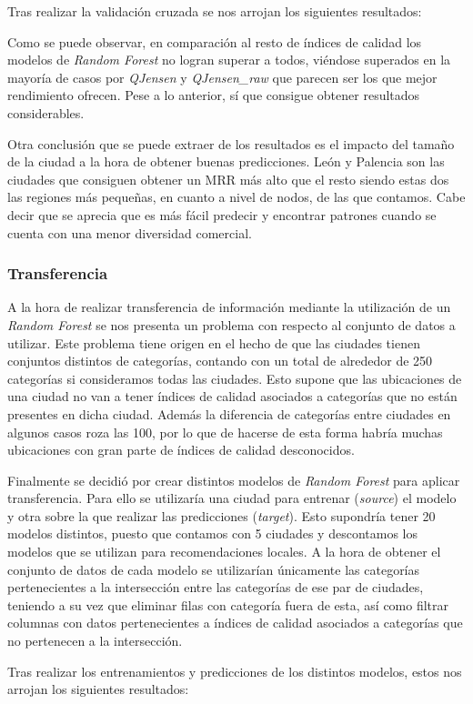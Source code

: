 Tras realizar la validación cruzada se nos arrojan los siguientes resultados:



Como se puede observar, en comparación al resto de índices de calidad los modelos de \textit{Random Forest} no logran superar a todos, viéndose superados en la mayoría de casos por \textit{QJensen} y \textit{QJensen\_raw} que parecen ser los que mejor rendimiento ofrecen. Pese a lo anterior, sí que consigue obtener resultados considerables.

Otra conclusión que se puede extraer de los resultados es el impacto del tamaño de la ciudad a la hora de obtener buenas predicciones. León y Palencia son las ciudades que consiguen obtener un MRR más alto que el resto siendo estas dos las regiones más pequeñas, en cuanto a nivel de nodos, de las que contamos. Cabe decir que se aprecia que es más fácil predecir y encontrar patrones cuando se cuenta con una menor diversidad comercial.
\subsubsection{Transferencia}

A la hora de realizar transferencia de información mediante la utilización de un \textit{Random Forest} se nos presenta un problema con respecto al conjunto de datos a utilizar. Este problema tiene origen en el hecho de que las ciudades tienen conjuntos distintos de categorías, contando con un total de alrededor de 250 categorías si consideramos todas las ciudades. Esto supone que las ubicaciones de una ciudad no van a tener índices de calidad asociados a categorías que no están presentes en dicha ciudad. Además la diferencia de categorías entre ciudades en algunos casos roza las 100, por lo que de hacerse de esta forma habría muchas ubicaciones con gran parte de índices de calidad desconocidos.


Finalmente se decidió por crear distintos modelos de \textit{Random Forest} para aplicar transferencia. Para ello se utilizaría una ciudad para entrenar (\textit{source}) el modelo y otra sobre la que realizar las predicciones (\textit{target}). Esto supondría tener 20 modelos distintos, puesto que contamos con 5 ciudades y descontamos los modelos que se utilizan para recomendaciones locales. A la hora de obtener el conjunto de datos de cada modelo se utilizarían únicamente las categorías pertenecientes a la intersección entre las categorías de ese par de ciudades, teniendo a su vez que eliminar filas con categoría fuera de esta, así como filtrar columnas con datos pertenecientes a índices de calidad asociados a categorías que no pertenecen a la intersección.

Tras realizar los entrenamientos y predicciones de los distintos modelos, estos nos arrojan los siguientes resultados:

